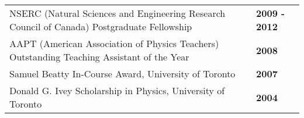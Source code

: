 \documentclass[margin,line]{res}
\begin{document}
\begin{resume}
\begin{tabular}{@{}p{4.5in}p{1.37in}}
NSERC (Natural Sciences and Engineering Research Council of Canada) Postgraduate Fellowship &  \hfill {\bf 2009 - 2012}\\
AAPT (American Association of Physics Teachers) Outstanding Teaching Assistant of the Year  &  \hfill {\bf 2008}\\
Samuel Beatty In-Course Award, University of Toronto & \hfill {\bf 2007}\\
Donald G. Ivey Scholarship in Physics, University of Toronto & \hfill {\bf 2004}\\

\end{tabular}

%
%
%






\end{resume}
\end{document}
